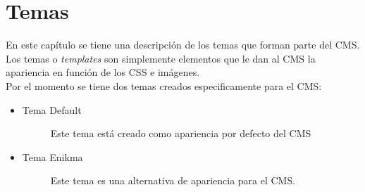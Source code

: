 \section{Temas}
En este cap\'itulo se tiene una descripci\'on de los temas que forman parte del CMS. Los temas o \textit{templates} son simplemente elementos que le dan al CMS la apariencia en funci\'on de los CSS e im\'agenes.\\
Por el momento se tiene dos temas creados especificamente para el CMS:

\begin{itemize}
\item \begin{description}
	\item[Tema Default] Este tema est\'a creado como apariencia por defecto del CMS
\end{description}
\item \begin{description}
	\item[Tema Enikma] Este tema es una alternativa de apariencia para el CMS.
\end{description}
\end{itemize}

\clearpage

